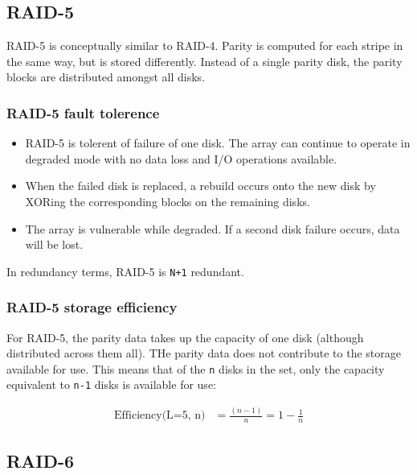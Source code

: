 \subsection{RAID-5}
\label{sec:raid-5}

RAID-5 is conceptually similar to RAID-4. Parity is computed for each
stripe in the same way, but is stored differently. Instead of a single
parity disk, the parity blocks are distributed amongst all disks.


\subsubsection{RAID-5 fault tolerence}
\label{sec:raid-5-fault-tolerence}

\begin{itemize}
\item
  RAID-5 is tolerent of failure of one disk. The array can continue to
  operate in degraded mode with no data loss and I/O operations
  available.
\item
  When the failed disk is replaced, a rebuild occurs onto the new disk
  by XORing the corresponding blocks on the remaining disks.
\item
  The array is vulnerable while degraded. If a second disk failure
  occurs, data will be lost.
\end{itemize}

In redundancy terms, RAID-5 is \texttt{N+1} redundant.

\subsubsection{RAID-5 storage efficiency}
\label{sec:raid-5-storage-efficiency}

For RAID-5, the parity data takes up the capacity of one disk (although
distributed across them all). THe parity data does not contribute to the
storage available for use. This means that of the \texttt{n} disks in
the set, only the capacity equivalent to \texttt{n-1} disks is available
for use:

\begin{align}
  \mbox{Efficiency(L=5, n)} & =  \frac{( n - 1 )}{n}  =  1 - \frac{1}{n} \label{eq:raid-5-storage-efficiency}
\end{align}

\subsection{RAID-6}
\label{sec:raid-6}

